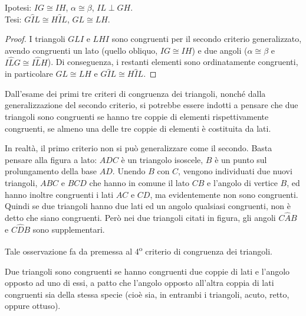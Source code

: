 \noindent \begin{minipage}{0.6\textwidth}
\noindent Ipotesi: $IG\cong IH$, $\alpha\cong \beta$, $IL\perp GH$.\\
Tesi: $G\widehat{I}L\cong H\widehat{I}L$, $GL\cong LH$.

\begin{proof}
I triangoli $GLI$ e $LHI$ sono congruenti per il secondo criterio 
generalizzato, avendo congruenti un lato (quello obliquo, $IG\cong 
IH$) e due angoli ($\alpha\cong \beta$ e $I\widehat{L}G \cong 
I\widehat{L}H$). Di conseguenza, i restanti elementi sono 
ordinatamente congruenti, in particolare $GL\cong LH$ e 
$G\widehat{I}L\cong H\widehat{I}L$.
\end{proof}
\end{minipage}\hfil
\begin{minipage}{0.4\textwidth}
\centering
\end{minipage}

\osservazione Dall'esame dei primi tre criteri di congruenza dei 
triangoli, nonché dalla generalizzazione del secondo criterio, si 
potrebbe essere indotti a pensare che due triangoli sono congruenti 
se hanno tre coppie di elementi rispettivamente congruenti, se almeno 
una delle tre coppie di elementi è costituita da lati.

\noindent \begin{minipage}{0.6\textwidth}
In realtà, il primo criterio non si può generalizzare come il 
secondo. Basta pensare alla figura a lato: $ADC$ è un triangolo 
isoscele, $B$ è un punto sul prolungamento della base $AD$. Unendo $B$ 
con $C$, vengono individuati due nuovi triangoli, $ABC$ e $BCD$ che 
hanno in comune il lato $CB$ e l'angolo di vertice $B$, ed hanno 
inoltre congruenti i lati $AC$ e $CD$, ma evidentemente non sono 
congruenti. Quindi se due triangoli hanno due lati ed un angolo 
qualsiasi congruenti, non è detto che siano congruenti. Però nei due 
triangoli citati in figura, gli angoli $C\widehat{A}B$ e 
$C\widehat{D}B$ sono supplementari.
\end{minipage}\hfil
\begin{minipage}{0.4\textwidth}
\centering
\end{minipage}

Tale osservazione fa da premessa al 4\textsuperscript{o} criterio di 
congruenza dei triangoli.
\begin{teorema}
Due triangoli sono congruenti se hanno congruenti due coppie di lati 
e l'angolo opposto ad uno di essi, a patto che l'angolo opposto 
all'altra coppia di lati congruenti sia della stessa specie (cioè 
sia, in entrambi i triangoli, acuto, retto, oppure ottuso).
\end{teorema}

